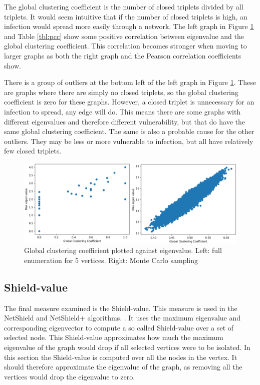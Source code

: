 \documentclass[11pt]{article}
\theoremstyle{definition}
\begin{document}
The global clustering coefficient is the number of closed triplets divided by all triplets. It would seem intuitive that if the number of closed triplets is high, an infection would spread more easily through a network. The left graph in Figure \ref{fig:measure_gcc} and Table \ref{tbl:pcc} show some positive correlation between eigenvalue and the global clustering coefficient. This correlation becomes stronger when moving to larger graphs as both the right graph and the Pearson correlation coefficients show. 

There is a group of outliers at the bottom left of the left graph in Figure \ref{fig:measure_gcc}. These are graphs where there are simply no closed triplets, so the global clustering coefficient is zero for these graphs. However, a closed triplet is unnecessary for an infection to spread, any edge will do. This means there are some graphs with different eigenvalues and therefore different vulnerability, but that do have the same global clustering coefficient. The same is also a probable cause for the other outliers. They may be less or more vulnerable to infection, but all have relatively few closed triplets. 

\begin{figure}[h!]
  \centering
    \includegraphics[width=1\textwidth]{results_graph_measures/Global_Clustering_Coefficient_c}

  \caption{Global clustering coefficient plotted against eigenvalue. Left: full enumeration for 5 vertices. Right: Monte Carlo sampling}
  \label{fig:measure_gcc}
\end{figure}

\subsection{Shield-value}

The final measure examined is the Shield-value. This measure is used in the NetShield and NetShield+ algorithms. \cite{chen2016node}. It uses the maximum eigenvalue and corresponding eigenvector to compute a so called Shield-value over a set of selected node. This Shield-value approximates how much the maximum eigenvalue of the graph would drop if all selected vertices were to be isolated. In this section the Shield-value is computed over all the nodes in the vertex. It should therefore approximate the eigenvalue of the graph, as removing all the vertices would drop the eigenvalue to zero.
\end{document}
